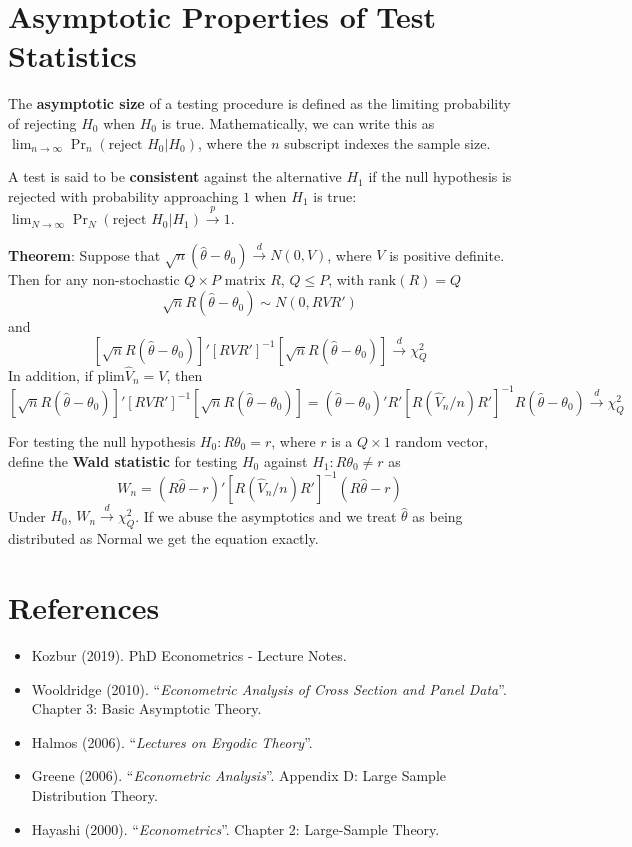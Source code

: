 \documentclass[12pt,]{book}
\providecommand{\tightlist}{%
  \setlength{\itemsep}{0pt}\setlength{\parskip}{0pt}}
\begin{document}
\hypertarget{asymptotic-properties-of-test-statistics}{%
\section{Asymptotic Properties of Test Statistics}\label{asymptotic-properties-of-test-statistics}}

The \textbf{asymptotic size} of a testing procedure is defined as the limiting probability of rejecting \(H_0\) when \(H_0\) is true. Mathematically, we can write this as \(\lim _ {n \to \infty} \Pr_n ( \text{reject } H_0 | H_0)\), where the \(n\) subscript indexes the sample size.

A test is said to be \textbf{consistent} against the alternative \(H_1\) if the null hypothesis is rejected with probability approaching \(1\) when \(H_1\) is true: \(\lim _ {N \to \infty} \Pr_N (\text{reject } H_0 | H_1) \overset{p}{\to} 1\).

\textbf{Theorem}:
Suppose that \(\sqrt{n}(\hat{\theta} - \theta_0) \overset{d}{\to} N(0, V)\), where \(V\) is positive definite. Then for any non-stochastic \(Q\times P\) matrix \(R\), \(Q \leq P\), with rank\(( R ) = Q\)
\[
    \sqrt{n} R (\hat{\theta} - \theta_0) \sim N(0, R VR')
\]
and
\[
    [\sqrt{n}R(\hat{\theta} - \theta_0)]'[RVR']^{-1}[\sqrt{n}R(\hat{\theta} - \theta_0)] \overset{d}{\to} \chi^2_Q
\]
In addition, if \(\text{plim} \hat{V} _n = V\), then
\[
    [\sqrt{n}R(\hat{\theta} - \theta_0)]'[RVR']^{-1}[\sqrt{n}R(\hat{\theta} - \theta_0)] = (\hat{\theta} - \theta_0)' R'[R (\hat{V} _n/n) R']^{-1}R (\hat{\theta} - \theta_0) \overset{d}{\to} \chi^2_Q 
\]

For testing the null hypothesis \(H_0: R\theta_0 = r\), where \(r\) is a \(Q\times1\) random vector, define the \textbf{Wald statistic} for testing \(H_0\) against \(H_1 : R\theta_0 \neq r\) as
\[
    W_n = (R\hat{\theta} - r)'[R (\hat{V} _n/n) R']^{-1} (R\hat{\theta} - r)
\]
Under \(H_0\), \(W_n \overset{d}{\to} \chi^2_Q\). If we abuse the asymptotics and we treat \(\hat{\theta}\) as being distributed as Normal we get the equation exactly.

\hypertarget{references-3}{%
\section{References}\label{references-3}}

\begin{itemize}
\tightlist
\item
  Kozbur (2019). PhD Econometrics - Lecture Notes.
\item
  Wooldridge (2010). ``\emph{Econometric Analysis of Cross Section and Panel Data}''. Chapter 3: Basic Asymptotic Theory.
\item
  Halmos (2006). ``\emph{Lectures on Ergodic Theory}''.
\item
  Greene (2006). ``\emph{Econometric Analysis}''. Appendix D: Large Sample Distribution Theory.
\item
  Hayashi (2000). ``\emph{Econometrics}''. Chapter 2: Large-Sample Theory.
\end{itemize}
\end{document}
